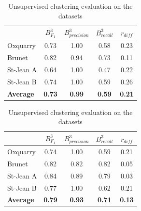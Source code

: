 \begin{table}
  \centering
  \caption{Unsupervised clustering evaluation on the datasets}
  \label{tab:unsupervised_clustering}

  \label{tab:unsupervised_clustering_0}
  \begin{tabular}{l c c c c}
    \toprule
    &
    $B^3_{F_1}$ &
    $B^3_{precision}$  &
    $B^3_{recall}$  &
    $r_{diff}$ \\
    \midrule
    Oxquarry         & 0.73 & 1.00 & 0.58 & 0.23\\
    Brunet           & 0.82 & 0.94 & 0.73 & 0.11\\
    St-Jean A        & 0.64 & 1.00 & 0.47 & 0.22\\
    St-Jean B        & 0.74 & 1.00 & 0.59 & 0.26\\
    \textbf{Average} &
    \textbf{0.73} &
    \textbf{0.99} &
    \textbf{0.59} &
    \textbf{0.21} \\
    \bottomrule
  \end{tabular}

  \label{tab:unsupervised_clustering_01}
  \begin{tabular}{l c c c c}
    \toprule
    &
    $B^3_{F_1}$ &
    $B^3_{precision}$  &
    $B^3_{recall}$  &
    $r_{diff}$ \\
    \midrule
    Oxquarry         & 0.74 & 1.00 & 0.59 & 0.21\\
    Brunet           & 0.82 & 0.82 & 0.82 & 0.05\\
    St-Jean A        & 0.84 & 0.89 & 0.79 & 0.03\\
    St-Jean B        & 0.77 & 1.00 & 0.62 & 0.21\\
    \textbf{Average} &
    \textbf{0.79} &
    \textbf{0.93} &
    \textbf{0.71} &
    \textbf{0.13} \\
    \bottomrule
  \end{tabular}
\end{table}

